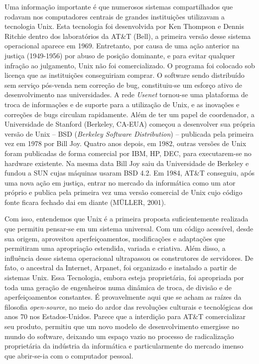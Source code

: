 Uma informação importante é que numerosos sistemas compartilhados que rodavam nos computadores centrais de grandes instituições utilizavam a tecnologia Unix. Esta tecnologia foi desenvolvida por Ken Thompson e Dennis Ritchie dentro dos laboratórios da AT\&T (Bell), a primeira versão desse sistema operacional aparece em 1969. Entretanto, por causa de uma ação anterior na justiça (1949-1956) por abuso de posição dominante, e para evitar qualquer infração ao julgamento, Unix não foi comercializado. O programa foi colocado sob licença que as instituições conseguiriam comprar. O software sendo distribuído sem serviço pós-venda nem correção de bug, constituiu-se um esforço ativo de desenvolvimento nas universidades. A rede \emph{Usenet} tornou-se uma plataforma de troca de informações e de suporte para a utilização de Unix, e as inovações e correções de bugs circulam rapidamente. Além de ter um papel de coordenador, a Universidade de Stanford (Berkeley, CA-EUA) começou a desenvolver sua própria versão de Unix – BSD (\emph{Berkeley Software Distribution}) – publicada pela primeira vez em 1978 por Bill Joy. Quatro anos depois, em 1982, outras versões de Unix foram publicadas de forma comercial por IBM, HP, DEC, para executarem-se no hardware existente. Na mesma data Bill Joy saiu da Universidade de Berkeley e fundou a SUN cujas máquinas usaram BSD 4.2. Em 1984, AT\&T conseguiu, após uma nova ação em justiça, entrar no mercado da informática como um ator próprio e publica pela primeira vez uma versão comercial de Unix cujo código fonte ficara fechado dai em diante (MÜLLER, 2001).

Com isso, entendemos que Unix é a primeira proposta suficientemente realizada que permitiu pensar-se em um sistema universal. Com um código acessível, desde sua origem, aproveitou aperfeiçoamentos, modificações e adaptações que permitiram uma apropriação estendida, variada e criativa. Além disso, a influência desse sistema operacional ultrapassou os construtores de servidores. De fato, o ancestral da Internet, Arpanet, foi organizado e instalado a partir de sistemas Unix. Essa Tecnologia, embora esteja proprietária, foi apropriada por toda uma geração de engenheiros numa dinâmica de troca, de divisão e de aperfeiçoamentos constantes. É provavelmente aqui que se acham as raízes da filosofia \emph{open-source}, no meio do ardor das revoluções culturais e tecnológicas dos anos 70 nos Estados-Unidos. Parece que a interdição para AT\&T comercializar seu produto, permitiu que um novo modelo de desenvolvimento emergisse no mundo do software, deixando um espaço vazio no processo de radicalização proprietária da indústria da informática e particularmente do mercado imenso que abrir-se-ia com o computador pessoal. 


